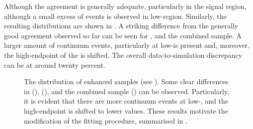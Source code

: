 Although the agreement is generally adequate, particularly in the signal region, although a small excess of events is observed in low-\EB region.
Similarly, the resulting \Mbc distributions are shown in .
A striking difference from the generally good agreement observed so far can be seen for \feiBp, \feiBz and the combined sample.
A larger amount of continuum events, particularly at low-\Mbc is present and,
moreover, the high-endpoint of the \Mbc is shifted.
The overall data-to-simulation discrepancy can be at around twenty percent.
\begin{figure}[htbp!]
    \centering
    \caption{\label{fig:qqbar_enhanced_mbc}
    The \Mbc distribution of \qqbar enhanced samples (see ).
    Some clear differences in \feiBp (), \feiBz (),
    and the combined sample () can be observed.
    Particularly, it is evident that there are more continuum events at low-\Mbc, 
    and the \Mbc high-endpoint is shifted to lower values.
    These results motivate the modification of the \Mbc fitting procedure, 
    summarised in .
    }
\end{figure}

